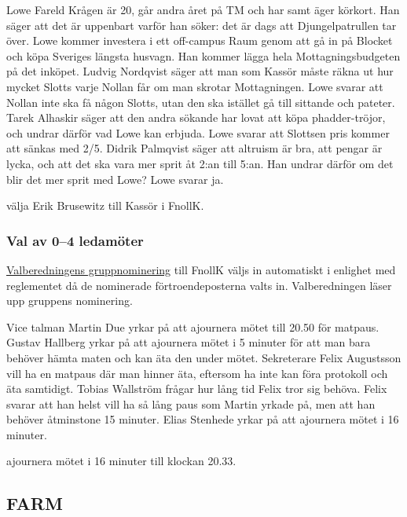 \documentclass[hidelinks]{sektionsmote} %
\begin{document}
Lowe Fareld Krågen är 20, går andra året på TM och har samt äger körkort.
Han säger att det är uppenbart varför han söker: det är dags att Djungelpatrullen tar över.
Lowe kommer investera i ett off-campus Raum genom att gå in på Blocket och köpa Sveriges längsta husvagn.
Han kommer lägga hela Mottagningsbudgeten på det inköpet.
Ludvig Nordqvist säger att man som Kassör måste räkna ut hur mycket Slotts varje Nollan får om man skrotar Mottagningen.
Lowe svarar att Nollan inte ska få någon Slotts, utan den ska istället gå till sittande och pateter.
Tarek Alhaskir säger att den andra sökande har lovat att köpa phadder-tröjor, och undrar därför vad Lowe kan erbjuda.
Lowe svarar att Slottsen pris kommer att sänkas med 2/5.
Didrik Palmqvist säger att altruism är bra, att pengar är lycka, och att det ska vara mer sprit åt 2:an till 5:an.
Han undrar därför om det blir det mer sprit med Lowe?
Lowe svarar ja.

\begin{beslut}
  \item välja Erik Brusewitz till Kassör i FnollK.
\end{beslut}

\subsubsection{Val av 0--4 ledamöter}
\hyperlink{bilagor/nomfnollk.pdf.1}{Valberedningens gruppnominering} till FnollK väljs in automatiskt i enlighet med reglementet då de nominerade förtroendeposterna valts in.
Valberedningen läser upp gruppens nominering.

\begin{ofraga}
  Vice talman Martin Due yrkar på att ajournera mötet till 20.50 för matpaus.
  Gustav Hallberg yrkar på att ajournera mötet i 5 minuter för att man bara behöver hämta maten och kan äta den under mötet.
  Sekreterare Felix Augustsson vill ha en matpaus där man hinner äta, eftersom ha inte kan föra protokoll och äta samtidigt.
  Tobias Wallström frågar hur lång tid Felix tror sig behöva.
  Felix svarar att han helst vill ha så lång paus som Martin yrkade på, men att han behöver åtminstone 15 minuter.
  Elias Stenhede yrkar på att ajournera mötet i 16 minuter.
  \begin{beslut}
    \item ajournera mötet i 16 minuter till klockan 20.33.
  \end{beslut}
\end{ofraga}

\subsection{FARM}
\end{document}
